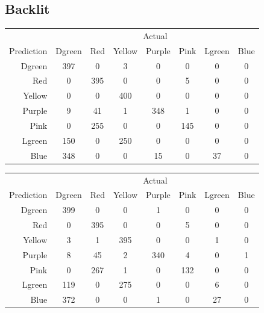 \documentclass[12pt]{article}
\begin{document}
\subsection*{Backlit}
\begin{center}
    \begin{tabular}{r|ccccccc}
	& \multicolumn{7}{c}{Actual} \\ 
    Prediction      & Dgreen & Red & Yellow & Purple & Pink & Lgreen & Blue \\ \hline
    Dgreen & 397    & 0   & 3      & 0      & 0    & 0      & 0    \\
    Red    & 0      & 395 & 0      & 0      & 5    & 0      & 0    \\
    Yellow & 0      & 0   & 400    & 0      & 0    & 0      & 0    \\
    Purple & 9      & 41  & 1      & 348    & 1    & 0      & 0    \\
    Pink   & 0      & 255 & 0      & 0      & 145  & 0      & 0    \\
    Lgreen & 150    & 0   & 250    & 0      & 0    & 0      & 0    \\
    Blue   & 348    & 0   & 0      & 15     & 0    & 37     & 0    \\
    \end{tabular}

\vspace{1em}

    \begin{tabular}{r|ccccccc}
	& \multicolumn{7}{c}{Actual} \\ 
    Prediction      & Dgreen & Red & Yellow & Purple & Pink & Lgreen & Blue \\ \hline
    Dgreen & 399    & 0   & 0      & 1      & 0    & 0      & 0    \\
    Red    & 0      & 395 & 0      & 0      & 5    & 0      & 0    \\
    Yellow & 3      & 1   & 395    & 0      & 0    & 1      & 0    \\
    Purple & 8      & 45  & 2      & 340    & 4    & 0      & 1    \\
    Pink   & 0      & 267 & 1      & 0      & 132  & 0      & 0    \\
    Lgreen & 119    & 0   & 275    & 0      & 0    & 6      & 0    \\
    Blue   & 372    & 0   & 0      & 1      & 0    & 27     & 0    \\
    \end{tabular}
\end{center}
\end{document}
